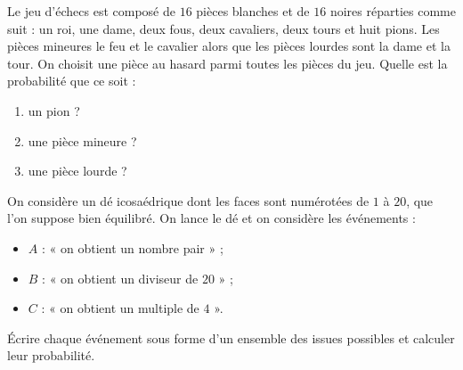 \documentclass[11pt]{article}
\begin{document}
\begin{exo}
  Le jeu d'échecs est composé de $16$ pièces blanches et de $16$ noires
  réparties comme suit : un roi, une dame, deux fous, deux cavaliers, deux tours
  et huit pions. Les pièces mineures le feu et le cavalier alors que les pièces
  lourdes sont la dame et la tour. On choisit une pièce au hasard parmi toutes
  les pièces du jeu. Quelle est la probabilité que ce soit :
  \begin{enumerate}
    \item un pion ?
    \item une pièce mineure ?
    \item une pièce lourde ?
  \end{enumerate}
\end{exo}

\begin{exo}
  On considère un dé icosaédrique dont les faces sont numérotées de $1$ à $20$,
  que l'on suppose bien équilibré. On lance le dé et on considère les événements
  :
  \begin{itemize}
    \item $A$ : « on obtient un nombre pair » ;
    \item $B$ : « on obtient un diviseur de $20$ » ;
    \item $C$ : « on obtient un multiple de $4$ ».
  \end{itemize}
  Écrire chaque événement sous forme d'un ensemble des issues possibles et
  calculer leur probabilité.
\end{exo}
\end{document}
